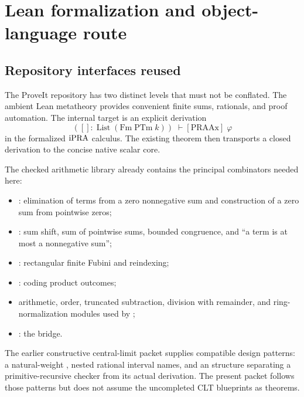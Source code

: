 \section{Lean formalization and object-language route}\label{sec:lean}

\subsection{Repository interfaces reused}

The ProveIt repository has two distinct levels that must not be conflated.
The ambient Lean metatheory provides convenient finite sums, rationals, and
proof automation.  The internal target is an explicit derivation
\[
 ([]:\operatorname{List}(\mathrm{Fm}\;\mathrm{PTm}\;k))
 \;\vdash[\mathrm{PRAAx}]\;\varphi
\]
in the formalized \(\mathrm{iPRA}\) calculus.  The existing
 theorem then transports a closed  derivation
to the concise native scalar core.

The checked arithmetic library already contains the principal combinators
needed here:
\begin{itemize}
\item {}: elimination of terms from a
  zero nonnegative sum and construction of a zero sum from pointwise zeros;
\item {}: sum shift, sum of pointwise sums,
  bounded congruence, and ``a term is at most a nonnegative sum'';
\item {}: rectangular finite Fubini and
  reindexing;
\item {}: coding product outcomes;
\item arithmetic, order, truncated subtraction, division with remainder, and
  ring-normalization modules used by ;
\item {}: the
   bridge.
\end{itemize}

The earlier constructive central-limit packet supplies compatible design
patterns: a natural-weight , nested rational interval
 names, and an  structure separating a
primitive-recursive checker from its actual  derivation.  The
present packet follows those patterns but does not assume the uncompleted CLT
blueprints as theorems.

